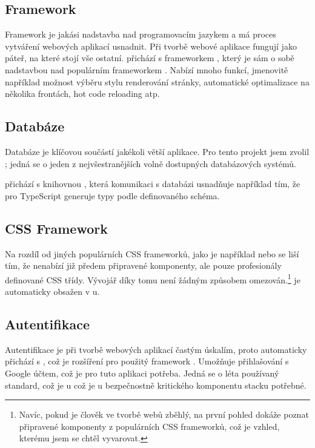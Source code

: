 \subsection{Framework}

Framework je jakási nadstavba nad programovacím jazykem a má proces vytváření webových aplikací usnadnit. Při tvorbě webové aplikace fungují jako páteř, na které stojí vše ostatní.  přichází s frameworkem , který je sám o sobě nadstavbou nad populárním frameworkem . Nabízí mnoho funkcí, jmenovitě například možnost výběru stylu renderování stránky, automatické optimalizace na několika frontách, hot code reloading atp.\cite{nextjs}

\subsection{Databáze}

Databáze je klíčovou součástí jakékoli větší aplikace. Pro tento projekt jsem zvolil ; jedná se o jeden z nejvšestranějších volně dostupných databázových systémů.

 přichází s knihovnou , která komunikaci s databázi usnadňuje například tím, že pro TypeScript generuje typy podle definovaného schéma.

\subsection{CSS Framework}

Na rozdíl od jiných populárních CSS frameworků, jako je například  nebo  se  liší tím, že nenabízí již předem připravené komponenty, ale pouze profesionály definované CSS třídy. Vývojář díky tomu není žádným způsobem omezován.\footnote{Navíc, pokud je člověk ve tvorbě webů zběhlý, na první pohled dokáže poznat připravené komponenty z populárních CSS frameworků, což je vzhled, kterému jsem se chtěl vyvarovat.}  je automaticky obsažen v u.

\subsection{Autentifikace}

Autentifikace je při tvorbě webových aplikací častým úskalím, proto  automaticky přichází s , což je rozšíření pro použitý framework . Umožňuje přihlašování s Google účtem, což je pro tuto aplikaci potřeba. Jedná se o léta používaný standard, což je u což je u bezpečnostně kritického komponentu stacku potřebné.